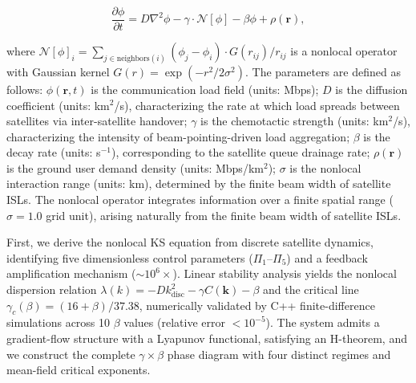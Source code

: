 \documentclass[sn-nature,pdflatex]{sn-jnl}
\begin{document}
\begin{equation}
\label{eq:ks_nonlocal}
\frac{\partial \phi}{\partial t} = D \nabla^2 \phi - \gamma \cdot \mathcal{N}[\phi] - \beta \phi + \rho(\mathbf{r}),
\end{equation}

where $\mathcal{N}[\phi]_i = \sum_{j \in \text{neighbors}(i)} (\phi_j - \phi_i) \cdot G(r_{ij})/r_{ij}$ is a nonlocal operator with Gaussian kernel $G(r)=\exp(-r^2/2\sigma^2)$. The parameters are defined as follows: $\phi(\mathbf{r},t)$ is the communication load field (units: Mbps); $D$ is the diffusion coefficient (units: km$^2$/s), characterizing the rate at which load spreads between satellites via inter-satellite handover; $\gamma$ is the chemotactic strength (units: km$^2$/s), characterizing the intensity of beam-pointing-driven load aggregation; $\beta$ is the decay rate (units: s$^{-1}$), corresponding to the satellite queue drainage rate; $\rho(\mathbf{r})$ is the ground user demand density (units: Mbps/km$^2$); $\sigma$ is the nonlocal interaction range (units: km), determined by the finite beam width of satellite ISLs.
The nonlocal operator integrates information over a finite spatial range ($\sigma = 1.0$ grid unit), arising naturally from the finite beam width of satellite ISLs.

First, we derive the nonlocal KS equation from discrete satellite dynamics, identifying five dimensionless control parameters ($\Pi_1$--$\Pi_5$) and a feedback amplification mechanism ($\sim 10^6\times$).
Linear stability analysis yields the nonlocal dispersion relation $\lambda(k) = -D k^2_{\text{disc}} - \gamma C(\mathbf{k}) - \beta$ and the critical line $\gamma_c(\beta) = (16+\beta)/37.38$, numerically validated by C++ finite-difference simulations across 10 $\beta$ values (relative error $<10^{-5}$).
The system admits a gradient-flow structure with a Lyapunov functional, satisfying an H-theorem, and we construct the complete $\gamma \times \beta$ phase diagram with four distinct regimes and mean-field critical exponents.
\end{document}
